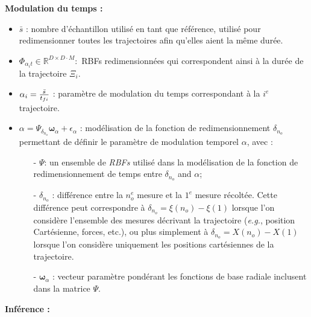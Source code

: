 \documentclass[utf8]{frontiersSCNS} %
\begin{document}
\textbf{Modulation du temps :}
\begin{itemize}
\item $\bar{s}$ : nombre d'échantillon utilisé en tant que référence, utilisé pour redimensionner toutes les trajectoires afin qu'elles aient la même durée.
\item $\Phi_{\alpha_i t} \in \mathbb{R}^{D\times D \cdot M} :$ RBFs redimensionnées qui correspondent ainsi à la durée de la trajectoire $\Xi_i$.
\item $\alpha_i = { \bar{s} \over t_{fi}}$ : paramètre de modulation du temps correspondant à la $i^e$ trajectoire.
\item $\alpha = \Psi_{\delta_{n_o}}\boldsymbol{\omega}_\alpha + \epsilon_\alpha$ : modélisation de la fonction de redimensionnement $\delta_{n_o}$ permettant de définir le paramètre de modulation temporel $\alpha$, avec :

\begin{itemize}
\item[-] $\Psi$: un ensemble de \textit{RBFs} utilisé dans la modélisation de la fonction de redimensionnement de temps entre $\delta_{n_o}$ and $\alpha$;
\item[-] $\delta_{n_o}$ : différence entre la $n_o^e$ mesure et la $1^e$ mesure récoltée. Cette différence peut correspondre à $\delta_{n_o}=\xi(n_o) - \xi(1)$ lorsque l'on considère l'ensemble des mesures décrivant la trajectoire (\textit{e.g.}, position Cartésienne, forces, etc.), ou plus simplement à $\delta_{n_o}= X(n_o) - X(1)$ lorsque l'on considère uniquement les positions cartésiennes de la trajectoire.
\item[-] $\boldsymbol{\omega}_\alpha$ : vecteur paramètre pondérant les fonctions de base radiale inclusent dans la matrice $\Psi$. 

\end{itemize}
\end{itemize}
\textbf{Inférence :}
\end{document}

